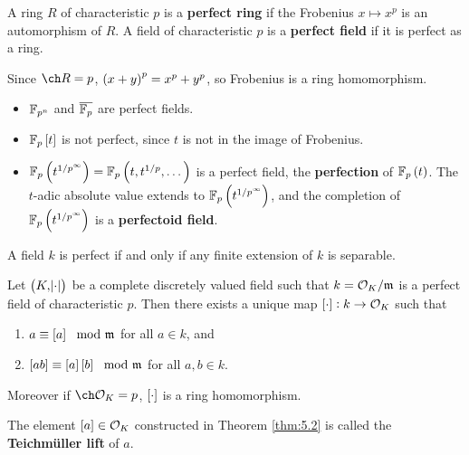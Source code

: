 \begin{definition}
A ring $ R $ of characteristic $ p $ is a \textbf{perfect ring} if the Frobenius $ x \mapsto x^p $ is an automorphism of $ R $. A field of characteristic $ p $ is a \textbf{perfect field} if it is perfect as a ring.
\end{definition}

\begin{remark*}
Since $ \ch R = p $, $ \br{x + y}^p = x^p + y^p $, so Frobenius is a ring homomorphism.
\end{remark*}

\begin{example*}
\hfill
\begin{itemize}
\item $ \mathbb{F}_{p^n} $ and $ \overline{\mathbb{F}_p} $ are perfect fields.
\item $ \FF_p\sbr{t} $ is not perfect, since $ t $ is not in the image of Frobenius.
\item $ \FF_p\br{t^{1 / p^\infty}} = \FF_p\br{t, t^{1 / p}, \dots} $ is a perfect field, the \textbf{perfection} of $ \FF_p\br{t} $. The $ t $-adic absolute value extends to $ \FF_p\br{t^{1 / p^\infty}} $, and the completion of $ \FF_p\br{t^{1 / p^\infty}} $ is a \textbf{perfectoid field}.
\end{itemize}
\end{example*}

\begin{fact*}
A field $ k $ is perfect if and only if any finite extension of $ k $ is separable.
\end{fact*}

\pagebreak

\begin{theorem}
\label{thm:5.2}
Let $ \br{K, \abs{\cdot}} $ be a complete discretely valued field such that $ k = \mathcal{O}_K / \mathfrak{m} $ is a perfect field of characteristic $ p $. Then there exists a unique map $ \sbr{\cdot} : k \to \OOO_K $ such that
\begin{enumerate}
\item $ a \equiv \sbr{a} \mod \mmm $ for all $ a \in k $, and
\item $ \sbr{ab} \equiv \sbr{a}\sbr{b} \mod \mmm $ for all $ a, b \in k $.
\end{enumerate}
Moreover if $ \ch \OOO_K = p $, $ \sbr{\cdot} $ is a ring homomorphism.
\end{theorem}

\begin{definition}
The element $ \sbr{a} \in \OOO_K $ constructed in Theorem \ref{thm:5.2} is called the \textbf{Teichm\"uller lift} of $ a $.
\end{definition}

